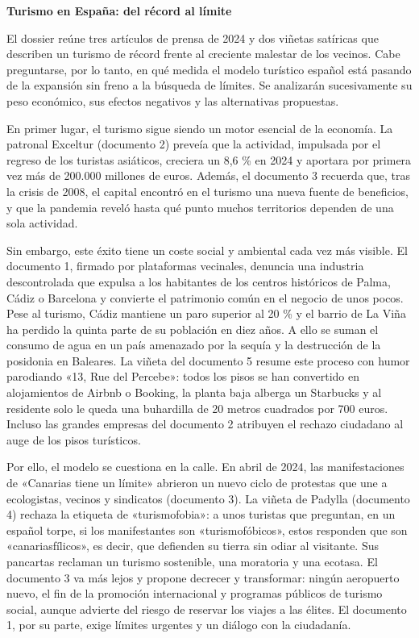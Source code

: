 \documentclass[11pt,a4paper]{article}
\begin{document}
\textbf{Turismo en España: del récord al límite}

El dossier reúne tres artículos de prensa de 2024 y dos viñetas satíricas que describen un turismo de récord frente al creciente malestar de los vecinos. Cabe preguntarse, por lo tanto, en qué medida el modelo turístico español está pasando de la expansión sin freno a la búsqueda de límites. Se analizarán sucesivamente su peso económico, sus efectos negativos y las alternativas propuestas.

En primer lugar, el turismo sigue siendo un motor esencial de la economía. La patronal Exceltur (documento 2) preveía que la actividad, impulsada por el regreso de los turistas asiáticos, creciera un 8,6 \% en 2024 y aportara por primera vez más de 200.000 millones de euros. Además, el documento 3 recuerda que, tras la crisis de 2008, el capital encontró en el turismo una nueva fuente de beneficios, y que la pandemia reveló hasta qué punto muchos territorios dependen de una sola actividad.

Sin embargo, este éxito tiene un coste social y ambiental cada vez más visible. El documento 1, firmado por plataformas vecinales, denuncia una industria descontrolada que expulsa a los habitantes de los centros históricos de Palma, Cádiz o Barcelona y convierte el patrimonio común en el negocio de unos pocos. Pese al turismo, Cádiz mantiene un paro superior al 20 \% y el barrio de La Viña ha perdido la quinta parte de su población en diez años. A ello se suman el consumo de agua en un país amenazado por la sequía y la destrucción de la posidonia en Baleares. La viñeta del documento 5 resume este proceso con humor parodiando «13, Rue del Percebe»: todos los pisos se han convertido en alojamientos de Airbnb o Booking, la planta baja alberga un Starbucks y al residente solo le queda una buhardilla de 20 metros cuadrados por 700 euros. Incluso las grandes empresas del documento 2 atribuyen el rechazo ciudadano al auge de los pisos turísticos.

Por ello, el modelo se cuestiona en la calle. En abril de 2024, las manifestaciones de «Canarias tiene un límite» abrieron un nuevo ciclo de protestas que une a ecologistas, vecinos y sindicatos (documento 3). La viñeta de Padylla (documento 4) rechaza la etiqueta de «turismofobia»: a unos turistas que preguntan, en un español torpe, si los manifestantes son «turismofóbicos», estos responden que son «canariasfílicos», es decir, que defienden su tierra sin odiar al visitante. Sus pancartas reclaman un turismo sostenible, una moratoria y una ecotasa. El documento 3 va más lejos y propone decrecer y transformar: ningún aeropuerto nuevo, el fin de la promoción internacional y programas públicos de turismo social, aunque advierte del riesgo de reservar los viajes a las élites. El documento 1, por su parte, exige límites urgentes y un diálogo con la ciudadanía.
\end{document}

